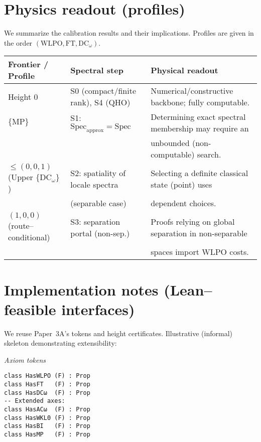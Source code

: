 \documentclass[11pt]{article}
\theoremstyle{plain}
\theoremstyle{definition}
\theoremstyle{remark}
\newcommand{\WLPO}{\mathrm{WLPO}}
\newcommand{\FT}{\mathrm{FT}}
\newcommand{\DCw}{\mathrm{DC}_\omega}
\newcommand{\MP}{\mathrm{MP}}
\begin{document}
\section{Physics readout (profiles)}

We summarize the calibration results and their implications. Profiles are given in the order $(\WLPO, \FT, \DCw)$.

\begin{center}
\begin{tabular}{|l|l|l|}
\hline
\textbf{Frontier / Profile} & \textbf{Spectral step} & \textbf{Physical readout} \\
\hline
Height $0$ & S0 (compact/finite rank), S4 (QHO) & Numerical/constructive backbone; fully computable. \\
\hline
$\{\MP\}$ & S1: $\mathrm{Spec}_{\mathrm{approx}}=\mathrm{Spec}$ & Determining exact spectral membership may require an \\
& & unbounded (non-computable) search. \\
\hline
$\le (0,0,1)$ (Upper $\{\DCw\}$) & S2: spatiality of locale spectra & Selecting a definite classical state (point) uses \\
& (separable case) & dependent choices. \\
\hline
$(1,0,0)$ (route--conditional) & S3: separation portal (non-sep.) & Proofs relying on global separation in non-separable \\
& & spaces import WLPO costs. \\
\hline
\end{tabular}
\end{center}

\section{Implementation notes (Lean--feasible interfaces)}

We reuse Paper~3A's tokens and height certificates. Illustrative (informal) skeleton demonstrating extensibility:

\medskip
\noindent\emph{Axiom tokens}
\begin{verbatim}
class HasWLPO (F) : Prop
class HasFT   (F) : Prop
class HasDCω  (F) : Prop
-- Extended axes:
class HasACω  (F) : Prop
class HasWKL0 (F) : Prop
class HasBI   (F) : Prop
class HasMP   (F) : Prop
\end{verbatim}
\end{document}
